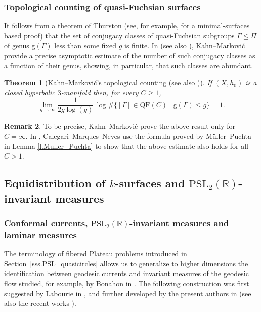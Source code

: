 \documentclass[11pt]{article}
\newcommand{\Subsection}{\subsection}
\newcommand{\Subsubsection}{\subsubsection}
\theoremstyle{plain}
\newtheorem{theorem}{Theorem}[section]
\theoremstyle{definition}
\newtheorem{remark}[theorem]{Remark}
\newcommand\PSL{\mathrm{PSL}_2(\mathbb{R})}
\begin{document}
\subsubsection{Topological counting of quasi-Fuchsian surfaces} It follows from a theorem of Thurston (see, for example, \cite[Th.\,4.5]{LabourieBourbaki} for a minimal-surfaces based proof) that the set of conjugacy classes of quasi-Fuchsian subgroups $\Gamma\leq\Pi$ of genus $\text{g}(\Gamma)$ less than some fixed $g$ is finite. In \cite{KM2} (see also \cite{CMN}), Kahn--Markovi\'c provide a precise asymptotic estimate of the number of such conjugacy classes as a function of their genus, showing, in particular, that such classes are abundant.

\begin{theorem}[Kahn--Markovi\'c's topological counting \cite{KM2} (see also \cite{CMN})]\label{th.KM2}
If $(X,h_0)$ is a closed hyperbolic $3$\nobreakdash-manifold then, for every $C\geq 1$,
\begin{equation}\label{eq.topo_counting}\lim_{g\to\infty}\frac{1}{2g\log(g)}\,\log\#\{[\Gamma]\in\mathrm{QF}(C)\mid\mathrm{g}(\Gamma)\leq g\}=1.
\end{equation}
\end{theorem}

\begin{remark}To be precise, Kahn--Markovi\'c prove the above result only for $C=\infty$. In \cite[Th.\,4.2.]{CMN}, Calegari--Marques--Neves use the formula proved by Müller--Puchta in Lemma \ref{l.Muller_Puchta} to show that the above estimate also holds for all $C>1$.
\end{remark}

\Subsection{Equidistribution of $k$-surfaces and $\PSL$-invariant measures}

\Subsubsection{Conformal currents, $\PSL$-invariant measures and laminar measures}\label{sss.conf_currents_PSL_inv_laminar_measures} The terminology of fibered Plateau problems introduced in Section~\ref{sss.PSL_quasicircles} allows us to generalize to higher dimensions the identification between geodesic currents and invariant measures of the geodesic flow studied, for example, by Bonahon in \cite{Bonahon_laminations}. The following construction was first suggested by Labourie in \cite{LabourieBourbaki}, and further developed by the present authors in \cite{ALS} (see also the recent works \cite{Brody_Reyes,MN_currents}).
\end{document}
